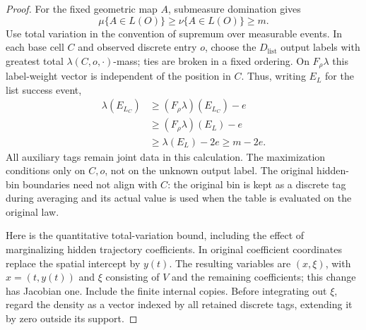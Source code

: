 \begin{proof}
For the fixed geometric map \(A\), submeasure domination gives
\begin{equation}
\mu\{A\in L(O)\}\ge\nu\{A\in L(O)\}\ge m.
 \label{a03:original-dominance}
\end{equation}
Use total variation in the convention of supremum over measurable
events.  In each base cell \(C\) and observed discrete entry \(o\),
choose the \(D_{\mathrm{list}}\) output labels with greatest total
\(\lambda(C,o,\cdot)\)-mass; ties are broken in a fixed ordering.
On \(F_\rho\lambda\) this label-weight vector is independent of the
position in \(C\).  Thus, writing \(E_L\) for the list success event,
\begin{align*}
 \lambda(E_{L_C})
 &\ge (F_\rho\lambda)(E_{L_C})-e\\
 &\ge (F_\rho\lambda)(E_L)-e\\
 &\ge \lambda(E_L)-2e
 \ge m-2e .
\end{align*}
All auxiliary tags remain joint data in this calculation.  The
maximization conditions only on \(C,o\), not on the unknown output
label.  The original hidden-bin boundaries need not align with \(C\):
the original bin is kept as a discrete tag during averaging and its
actual value is used when the table is evaluated on the original law.

Here is the quantitative total-variation bound, including the effect
of marginalizing hidden trajectory coefficients.  In original
coefficient coordinates replace the spatial intercept by \(y(t)\).
The resulting variables are \((x,\xi)\), with
\(x=(t,y(t))\) and \(\xi\) consisting of \(V\) and the remaining
coefficients; this change has Jacobian one.  Include the finite
internal copies.  Before integrating out \(\xi\), regard the density
as a vector indexed by all retained discrete tags, extending it by
zero outside its support.


\end{proof}
